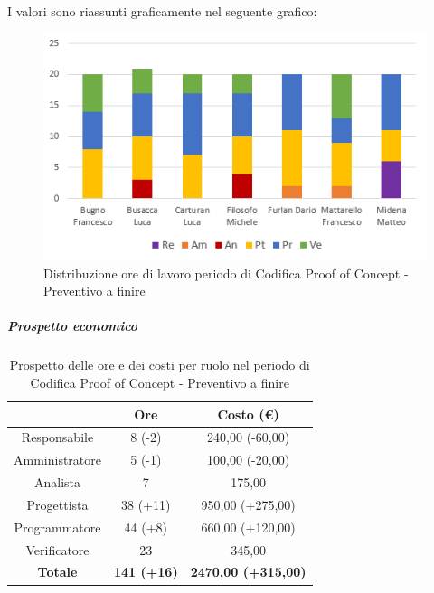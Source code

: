 I valori sono riassunti graficamente nel seguente grafico:
\begin{figure}[H]
  \centering
  \includegraphics[scale=0.9]{immagini/ore_lavoro_preventivo_finire_PoC.png}
  \caption{Distribuzione ore di lavoro periodo di Codifica Proof of Concept - Preventivo a finire}
\end{figure}

\subparagraph{Prospetto economico} \label{subparagraph:prospetto_economico_PoC}

\begin{table}[H]
  \centering
  \renewcommand{\arraystretch}{1.8}
  \begin{tabular}{c|c|c}
    \rowcolor[HTML]{125E28}
    \multicolumn{1}{c}{\color[HTML]{FFFFFF}\textbf{Ruolo}}
                    & \multicolumn{1}{c}{\color[HTML]{FFFFFF}\textbf{Ore}}
                    & \multicolumn{1}{c}{\color[HTML]{FFFFFF}\textbf{Costo (€)}}                              \\
    \hline
    Responsabile    & 8 (-2)                                                     & 240,00 (-60,00)            \\
    Amministratore  & 5 (-1)                                                     & 100,00 (-20,00)            \\
    Analista        & 7                                                          & 175,00                     \\
    Progettista     & 38 (+11)                                                   & 950,00 (+275,00)           \\
    Programmatore   & 44 (+8)                                                    & 660,00 (+120,00)           \\
    Verificatore    & 23                                                         & 345,00                     \\
    \textbf{Totale} & \textbf{141 (+16)}                                         & \textbf{2470,00 (+315,00)} \\
  \end{tabular}
  \caption{Prospetto delle ore e dei costi per ruolo nel periodo di Codifica Proof of Concept - Preventivo a finire}
\end{table}

